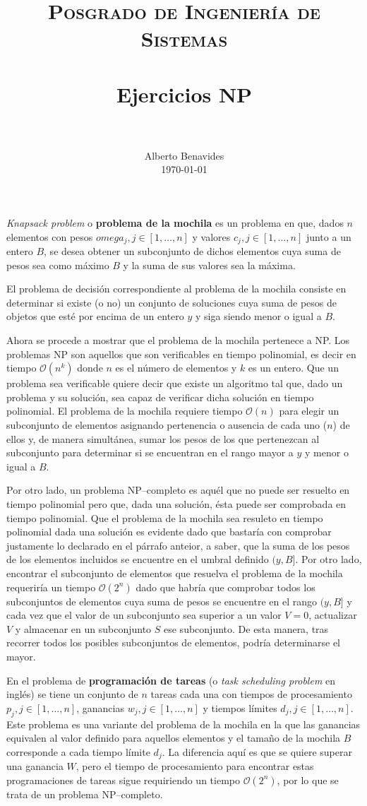 \documentclass[paper=leter, fontsize=11pt]{scrartcl}
\title{
		\usefont{OT1}{bch}{b}{n}
		\normalfont \normalsize \textsc{Posgrado de Ingeniería de Sistemas} \\ [25pt]
		\horrule{0.5pt} \\[0.4cm]
		\huge Ejercicios NP \\
		\horrule{2pt} \\[0.5cm]
}
\author{
		\normalfont 								\normalsize
        Alberto Benavides\\[-3pt]		\normalsize
        \today
}
\date{}
\numberwithin{equation}{section}		%
\numberwithin{figure}{section}			%
\numberwithin{table}{section}				%
\begin{document}
\maketitle
\textit{Knapsack problem} o \textbf{problema de la mochila} es un problema en que, dados $n$ elementos con pesos $omega_j, j \in [1, \ldots,  n]$ y valores $c_j, j \in [1, \ldots, n]$ junto a un entero $B$, se desea obtener un subconjunto de dichos elementos cuya suma de pesos sea como máximo $B$ y la suma de sus valores sea la máxima.

El problema de decisión correspondiente al problema de la mochila consiste en determinar si existe (o no) un conjunto de soluciones cuya suma de pesos de objetos que esté por encima de un entero $y$ y siga siendo menor o igual a $B$.

Ahora se procede a mostrar que el problema de la mochila pertenece a NP. Los problemas NP son aquellos que son verificables en tiempo polinomial, es decir en tiempo $\mathcal{O}(n^k)$ donde $n$ es el número de elementos y $k$ es un entero. Que un problema sea verificable quiere decir que existe un algoritmo tal que, dado un problema y su solución, sea capaz de verificar dicha solución en tiempo polinomial. El problema de la mochila requiere tiempo $\mathcal{O}(n)$ para elegir un subconjunto de elementos asignando pertenencia o ausencia de cada uno ($n$) de ellos y, de manera simultánea, sumar los pesos de los que pertenezcan al subconjunto para determinar si se encuentran en el rango mayor a $y$ y menor o igual a $B$.

Por otro lado, un problema NP--completo es aquél que no puede ser resuelto en tiempo polinomial pero que, dada una solución, ésta puede ser comprobada en tiempo polinomial. Que el problema de la mochila sea resuleto en tiempo polinomial dada una solución es evidente dado que bastaría con comprobar justamente lo declarado en el párrafo anteior, a saber, que la suma de los pesos de los elementos incluidos se encuentre en el umbral definido $(y, B]$. Por otro lado, encontrar el subconjunto de elementos que resuelva el problema de la mochila requeriría un tiempo $\mathcal{O}(2^n)$ dado que habría que comprobar todos los subconjuntos de elementos cuya suma de pesos se encuentre en el rango $(y, B]$ y cada vez que el valor de un subconjunto sea superior a un valor $V = 0$, actualizar $V$ y almacenar en un subconjunto $S$ ese subconjunto. De esta manera, tras recorrer todos los posibles subconjuntos de elementos, podría determinarse el mayor.

En el problema de \textbf{programación de tareas} (o \textit{task scheduling problem} en inglés) se tiene un conjunto de $n$ tareas cada una con tiempos de procesamiento $p_j, j \in [1, \ldots, n]$, ganancias $w_j, j \in [1, \ldots, n]$ y tiempos límites $d_j, j \in [1, \ldots, n]$. Este problema es una variante del problema de la mochila en la que las ganancias equivalen al valor definido para aquellos elementos y el tamaño de la mochila $B$ corresponde a cada tiempo límite $d_j$. La diferencia aquí es que se quiere superar una ganancia $W$, pero el tiempo de procesamiento para encontrar estas programaciones de tareas sigue requiriendo un tiempo $\mathcal{O}(2^n)$, por lo que se trata de un problema NP--completo.
\end{document}
